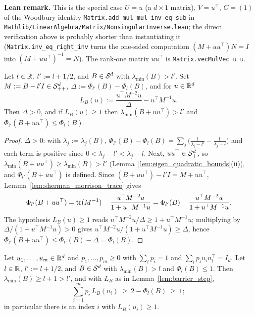 \textbf{Lean remark.} This is the special case $U = u$ (a $d \times 1$ matrix), $V = u^\top$,
$C = (1)$ of the Woodbury identity \texttt{Matrix.add\_mul\_mul\_inv\_eq\_sub} in
\texttt{Mathlib/LinearAlgebra/Matrix/NonsingularInverse.lean}; the direct verification above is
probably shorter than instantiating it (\texttt{Matrix.inv\_eq\_right\_inv} turns the one-sided
computation $(M + uu^\top)N = I$ into $(M+uu^\top)^{-1} = N$). The rank-one
matrix $uu^\top$ is \texttt{Matrix.vecMulVec u u}.

\begin{lemma}\label{lem:barrier_step}
\leanok
{}
Let $l \in \mathbb{R}$, $l' := l + 1/2$, and $B \in \mathcal{S}^{d}$ with $\lambda_{\min}(B) > l'$. Set
$M := B - l'I \in \mathcal{S}_{++}^{d}$, $\Delta := \Phi_{l'}(B) - \Phi_l(B)$, and for $u \in \mathbb{R}^d$
\[
  L_B(u) := \frac{u^\top M^{-2}u}{\Delta} - u^\top M^{-1}u .
\]
Then $\Delta > 0$, and if $L_B(u) \ge 1$ then
$\lambda_{\min}(B + uu^\top) > l'$ and $\Phi_{l'}(B + uu^\top) \le \Phi_l(B)$.
\end{lemma}

\begin{proof}
\leanok
{}
$\Delta > 0$: with $\lambda_j := \lambda_j(B)$, $\Phi_{l'}(B) - \Phi_l(B) = \sum_j\big(\tfrac{1}{\lambda_j - l'} -
\tfrac{1}{\lambda_j - l}\big)$ and each term is positive since $0 < \lambda_j - l' < \lambda_j - l$.
Next, $uu^\top \in \mathcal{S}_{+}^{d}$, so $\lambda_{\min}(B + uu^\top) \ge \lambda_{\min}(B) > l'$
(Lemma~\ref{lem:eigen_quadratic_bounds}(ii)), and $\Phi_{l'}(B + uu^\top)$ is defined. Since
$(B + uu^\top) - l'I = M + uu^\top$, Lemma~\ref{lem:sherman_morrison_trace} gives
\[
  \Phi_{l'}(B + uu^\top) = \operatorname{tr}(M^{-1}) - \frac{u^\top M^{-2}u}{1 + u^\top M^{-1}u}
  = \Phi_{l'}(B) - \frac{u^\top M^{-2}u}{1 + u^\top M^{-1}u} .
\]
The hypothesis $L_B(u) \ge 1$ reads $u^\top M^{-2}u/\Delta \ge 1 + u^\top M^{-1}u$; multiplying by
$\Delta/(1 + u^\top M^{-1}u) > 0$ gives $u^\top M^{-2}u/(1 + u^\top M^{-1}u) \ge \Delta$, hence
$\Phi_{l'}(B + uu^\top) \le \Phi_{l'}(B) - \Delta = \Phi_l(B)$.
\end{proof}

\begin{lemma}\label{lem:barrier_average}
\leanok
{}
Let $u_1,\dots,u_m \in \mathbb{R}^d$ and $p_1,\dots,p_m \ge 0$ with $\sum_ip_i = 1$ and
$\sum_i p_iu_iu_i^\top = I_d$. Let $l \in \mathbb{R}$, $l' := l + 1/2$, and $B \in \mathcal{S}^{d}$ with
$\lambda_{\min}(B) > l$ and $\Phi_l(B) \le 1$. Then $\lambda_{\min}(B) \ge l + 1 > l'$, and with
$L_B$ as in Lemma~\ref{lem:barrier_step},
\[
  \sum_{i=1}^m p_i\,L_B(u_i) \ \ge\ 2 - \Phi_l(B) \ \ge\ 1 ;
\]
in particular there is an index $i$ with $L_B(u_i) \ge 1$.
\end{lemma}

